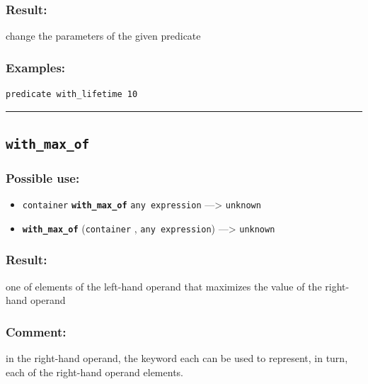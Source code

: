 \documentclass[]{book}
\providecommand{\tightlist}{%
  \setlength{\itemsep}{0pt}\setlength{\parskip}{0pt}}
\theoremstyle{definition}
\theoremstyle{definition}
\theoremstyle{definition}
\theoremstyle{remark}
\begin{document}
\subsubsection{Result:}\label{result-535}

change the parameters of the given predicate

\subsubsection{Examples:}\label{examples-383}

\begin{verbatim}
predicate with_lifetime 10 
\end{verbatim}

\begin{center}\rule{0.5\linewidth}{\linethickness}\end{center}

\subsection{\texorpdfstring{\texttt{with\_max\_of}}{with\_max\_of}}\label{with_max_of}

\subsubsection{Possible use:}\label{possible-use-557}

\begin{itemize}
\tightlist
\item
  \texttt{container} \textbf{\texttt{with\_max\_of}}
  \texttt{any\ expression} ---\textgreater{} \texttt{unknown}
\item
  \textbf{\texttt{with\_max\_of}} (\texttt{container} ,
  \texttt{any\ expression}) ---\textgreater{} \texttt{unknown}
\end{itemize}

\subsubsection{Result:}\label{result-536}

one of elements of the left-hand operand that maximizes the value of the
right-hand operand

\subsubsection{Comment:}\label{comment-109}

in the right-hand operand, the keyword each can be used to represent, in
turn, each of the right-hand operand elements.
\end{document}
